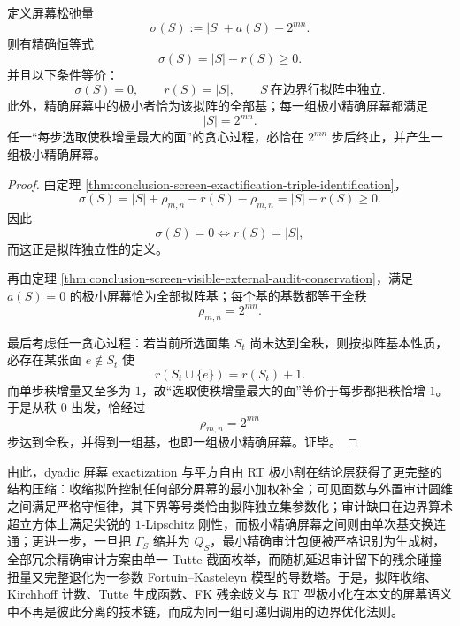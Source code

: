 \begin{theorem}[零松弛律与极小精确屏幕的拟阵判别]\label{thm:conclusion-screen-zero-slack-matroid-basis-criterion}
定义屏幕松弛量
\[
\sigma(S):=|S|+a(S)-2^{mn}.
\]
则有精确恒等式
\[
\sigma(S)=|S|-r(S)\ge 0.
\]
并且以下条件等价：
\[
\sigma(S)=0,
\qquad
r(S)=|S|,
\qquad
S\ \text{在边界行拟阵中独立}.
\]
此外，精确屏幕中的极小者恰为该拟阵的全部基；每一组极小精确屏幕都满足
\[
|S|=2^{mn}.
\]
任一“每步选取使秩增量最大的面”的贪心过程，必恰在 \(2^{mn}\) 步后终止，并产生一组极小精确屏幕。
\end{theorem}
\begin{proof}
由定理 \ref{thm:conclusion-screen-exactification-triple-identification}，
\[
\sigma(S)=|S|+\rho_{m,n}-r(S)-\rho_{m,n}=|S|-r(S)\ge 0.
\]
因此
\[
\sigma(S)=0
\iff
r(S)=|S|,
\]
而这正是拟阵独立性的定义。

再由定理 \ref{thm:conclusion-screen-visible-external-audit-conservation}，满足 \(a(S)=0\) 的极小屏幕恰为全部拟阵基；每个基的基数都等于全秩
\[
\rho_{m,n}=2^{mn}.
\]

最后考虑任一贪心过程：若当前所选面集 \(S_t\) 尚未达到全秩，则按拟阵基本性质，必存在某张面 \(e\notin S_t\) 使
\[
r(S_t\cup\{e\})=r(S_t)+1.
\]
而单步秩增量又至多为 \(1\)，故“选取使秩增量最大的面”等价于每步都把秩恰增 \(1\)。于是从秩 \(0\) 出发，恰经过
\[
\rho_{m,n}=2^{mn}
\]
步达到全秩，并得到一组基，也即一组极小精确屏幕。证毕。
\end{proof}

\noindent
由此，dyadic 屏幕 exactization 与平方自由 RT 极小割在结论层获得了更完整的结构压缩：收缩拟阵控制任何部分屏幕的最小加权补全；可见面数与外置审计圆维之间满足严格守恒律，其下界等号类恰由拟阵独立集参数化；审计缺口在边界算术超立方体上满足尖锐的 \(1\)-Lipschitz 刚性，而极小精确屏幕之间则由单次基交换连通；更进一步，一旦把 \(\Gamma_S\) 缩并为 \(Q_S\)，最小精确审计包便被严格识别为生成树，全部冗余精确审计方案由单一 Tutte 截面枚举，而随机延迟审计留下的残余碰撞扭量又完整退化为一参数 Fortuin--Kasteleyn 模型的导数塔。于是，拟阵收缩、Kirchhoff 计数、Tutte 生成函数、FK 残余歧义与 RT 型极小化在本文的屏幕语义中不再是彼此分离的技术链，而成为同一组可递归调用的边界优化法则。





\endinput

